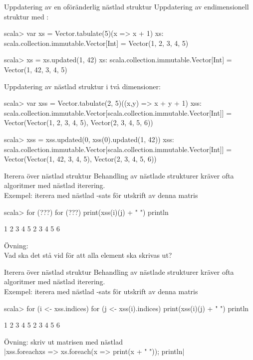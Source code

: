 \begin{Slide}{Uppdatering av en oföränderlig nästlad struktur}\SlideFontSmall
Uppdatering av endimensionell struktur med :\\
{\SlideFontTiny{} }
\begin{REPL}
scala> var xs = Vector.tabulate(5)(x => x + 1)
xs: scala.collection.immutable.Vector[Int] = Vector(1, 2, 3, 4, 5)

scala> xs = xs.updated(1, 42)
xs: scala.collection.immutable.Vector[Int] = Vector(1, 42, 3, 4, 5)
\end{REPL}

Uppdatering av nästlad struktur i två dimensioner:
\begin{REPL}
scala> var xss = Vector.tabulate(2, 5)((x,y) => x + y + 1)
xss:
  scala.collection.immutable.Vector[scala.collection.immutable.Vector[Int]] =
  Vector(Vector(1, 2, 3, 4, 5), Vector(2, 3, 4, 5, 6))

scala> xss = xss.updated(0, xss(0).updated(1, 42))
xss:
  scala.collection.immutable.Vector[scala.collection.immutable.Vector[Int]] =
  Vector(Vector(1, 42, 3, 4, 5), Vector(2, 3, 4, 5, 6))
\end{REPL}

\end{Slide}


\begin{Slide}{Iterera över nästlad struktur}\SlideFontSmall
Behandling av nästlade strukturer kräver ofta algoritmer med nästlad iterering. \\
Exempel: iterera med nästlad -sats för utskrift av denna matris\\
\pause
\begin{REPL}
scala> for (???) {
         for (???) {
           print(xss(i)(j) + " ")
         }
         println
       }

1 2 3 4 5
2 3 4 5 6
\end{REPL}
Övning: \\Vad ska det stå vid  för att alla element ska skrivas ut?
\end{Slide}

\begin{Slide}{Iterera över nästlad struktur}\SlideFontSmall
  \vspace{1em}
  Behandling av nästlade strukturer kräver ofta algoritmer med nästlad iterering. \\
  Exempel: iterera med nästlad -sats för utskrift av denna matris \\

  \begin{REPL}
scala> for (i <- xss.indices) {
         for (j <- xss(i).indices) {
           print(xss(i)(j) + " ")
         }
         println
       }

1 2 3 4 5
2 3 4 5 6
\end{REPL}
Övning: skriv ut matrisen med nästlad \\
\pause
\code|xss.foreach{xs => xs.foreach(x => print(x + " ")); println}|
\end{Slide}


